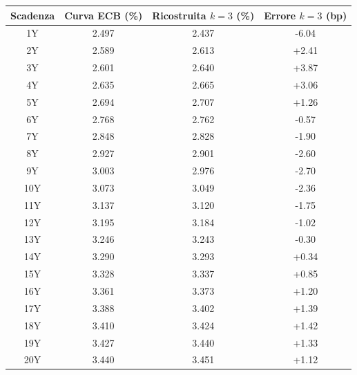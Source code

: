 \begin{center}
\renewcommand{\arraystretch}{1.15}
\begin{tabular}{c c c c}
\toprule
Scadenza & Curva ECB (\%) & Ricostruita $k=3$ (\%) & Errore $k=3$ (bp) \\
\midrule
1Y & 2.497 & 2.437 & -6.04 \\
2Y & 2.589 & 2.613 & +2.41 \\
3Y & 2.601 & 2.640 & +3.87 \\
4Y & 2.635 & 2.665 & +3.06 \\
5Y & 2.694 & 2.707 & +1.26 \\
6Y & 2.768 & 2.762 & -0.57 \\
7Y & 2.848 & 2.828 & -1.90 \\
8Y & 2.927 & 2.901 & -2.60 \\
9Y & 3.003 & 2.976 & -2.70 \\
10Y & 3.073 & 3.049 & -2.36 \\
11Y & 3.137 & 3.120 & -1.75 \\
12Y & 3.195 & 3.184 & -1.02 \\
13Y & 3.246 & 3.243 & -0.30 \\
14Y & 3.290 & 3.293 & +0.34 \\
15Y & 3.328 & 3.337 & +0.85 \\
16Y & 3.361 & 3.373 & +1.20 \\
17Y & 3.388 & 3.402 & +1.39 \\
18Y & 3.410 & 3.424 & +1.42 \\
19Y & 3.427 & 3.440 & +1.33 \\
20Y & 3.440 & 3.451 & +1.12 \\
\bottomrule
\end{tabular}
\end{center}

